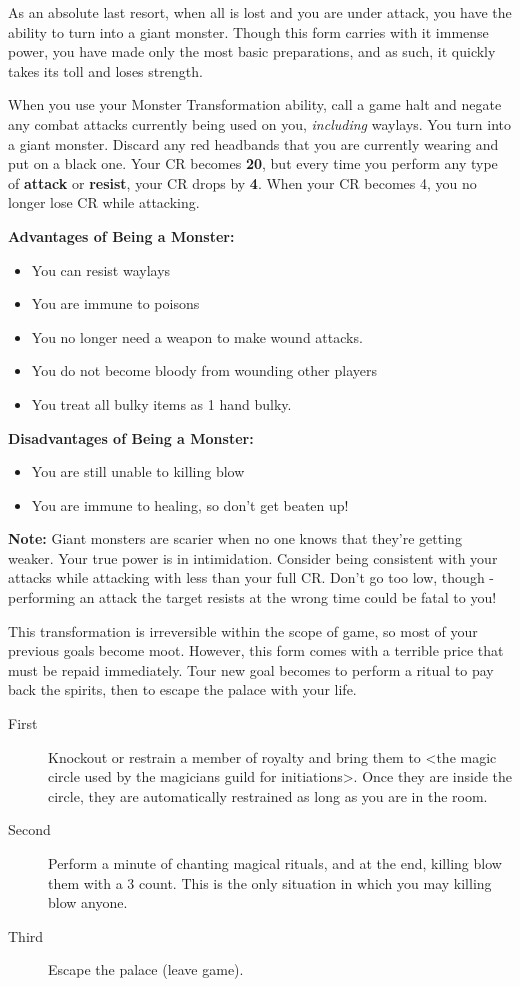 \documentclass[green]{NeptuneBall}
\begin{document}
\name{\gMonsterTransformation{}}

As an absolute last resort, when all is lost and you are under attack, you have the ability to turn into a giant monster. Though this form carries with it immense power, you have made only the most basic preparations, and as such, it quickly takes its toll and loses strength.

When you use your Monster Transformation ability, call a game halt and negate any combat attacks currently being used on you, \emph{including} waylays. You turn into a giant monster. Discard any red headbands that you are currently wearing and put on a black one. Your CR becomes {\bf 20}, but every time you perform any type of {\bf attack} or {\bf resist}, your CR drops by {\bf 4}. When your CR becomes 4, you no longer lose CR while attacking.


{\bf Advantages of Being a Monster:}
\begin{itemize}
\item You can resist waylays
\item You are immune to poisons
\item You no longer need a weapon to make wound attacks.
\item You do not become bloody from wounding other players
\item You treat all bulky items as 1 hand bulky.
\end{itemize}

{\bf Disadvantages of Being a Monster:}
\begin{itemize}
\item You are still unable to killing blow
\item You are immune to healing, so don't get beaten up!
\end{itemize}

{\bf Note:} Giant monsters are scarier when no one knows that they're getting weaker. Your true power is in intimidation. Consider being consistent with your attacks while attacking with less than your full CR. Don't go too low, though - performing an attack the target resists at the wrong time could be fatal to you! 

This transformation is irreversible within the scope of game, so most of your previous goals become moot. However, this form comes with a terrible price that must be repaid immediately. Tour new goal becomes to perform a ritual to pay back the spirits, then to escape the palace with your life.

\begin{description}
\item[First] Knockout or restrain a member of royalty and bring them to <the magic circle used by the magicians guild for initiations>. Once they are inside the circle, they are automatically restrained as long as you are in the room.
\item[Second] Perform a minute of chanting magical rituals, and at the end, killing blow them with a 3 count. This is the only situation in which you may killing blow anyone.
\item[Third] Escape the palace (leave game).
\end{description}
\end{document}
